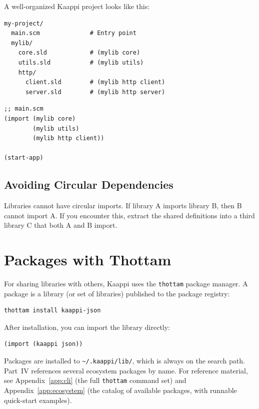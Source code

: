 A well-organized Kaappi project looks like this:

\begin{Verbatim}[fontsize=\small]
my-project/
  main.scm              # Entry point
  mylib/
    core.sld            # (mylib core)
    utils.sld           # (mylib utils)
    http/
      client.sld        # (mylib http client)
      server.sld        # (mylib http server)
\end{Verbatim}

\begin{lstlisting}
;; main.scm
(import (mylib core)
        (mylib utils)
        (mylib http client))

(start-app)
\end{lstlisting}

\subsection{Avoiding Circular Dependencies}

Libraries cannot have circular imports. If library A imports library B, then B cannot import A. If you encounter this, extract the shared definitions into a third library C that both A and B import.

\section{Packages with Thottam}

For sharing libraries with others, Kaappi uses the \texttt{thottam} package manager. A package is a library (or set of libraries) published to the package registry:

\begin{Verbatim}[fontsize=\small]
thottam install kaappi-json
\end{Verbatim}

After installation, you can import the library directly:

\begin{lstlisting}
(import (kaappi json))
\end{lstlisting}

Packages are installed to \texttt{\textasciitilde/.kaappi/lib/}, which is always on the search path. Part~IV references several ecosystem packages by name. For reference material, see Appendix~\ref{app:cli} (the full \texttt{thottam} command set) and Appendix~\ref{app:ecosystem} (the catalog of available packages, with runnable quick-start examples).

